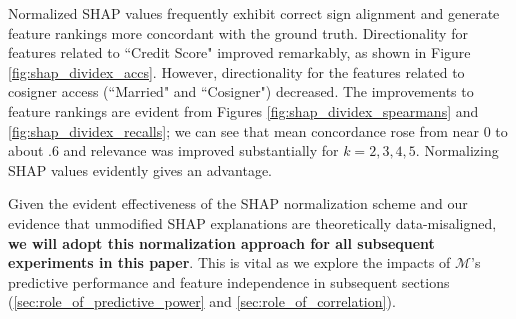 \documentclass[mnsc,blindrev]{informs3}
\begin{document}
             Normalized SHAP values frequently exhibit correct sign alignment and generate feature rankings more concordant with the ground truth. Directionality for features related to ``Credit Score" improved remarkably, as shown in Figure \ref{fig:shap_dividex_accs}. However, directionality for the features related to cosigner access (``Married" and ``Cosigner") decreased. The improvements to feature rankings are evident from Figures \ref{fig:shap_dividex_spearmans} and \ref{fig:shap_dividex_recalls}; we can see that mean concordance rose from near 0 to about .6 and relevance was improved substantially for $k=2,3,4,5$. Normalizing SHAP values evidently gives an advantage.
             
            
             Given the evident effectiveness of the SHAP normalization scheme and our evidence that unmodified SHAP explanations are theoretically  data-misaligned, \textbf{we will adopt this normalization approach for all subsequent experiments in this paper}. This is vital as we explore the impacts of $\mathcal{M}$'s predictive performance and feature independence in subsequent sections (\ref{sec:role_of_predictive_power} and \ref{sec:role_of_correlation}). %
\end{document}
